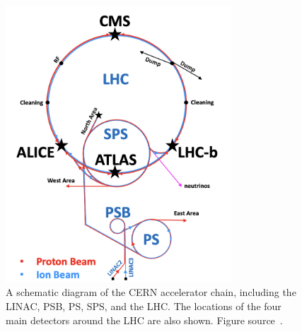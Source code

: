 \begin{figure}[t!]
\centering
\includegraphics[width=0.75\textwidth]{figures/acceleration_chain.png}
\caption[A diagram of the CERN accelerator chain]
{A schematic diagram of the CERN accelerator chain, including the LINAC, PSB, PS, SPS, and the LHC. The locations of the four main detectors around the LHC are also shown. Figure source~\cite{acceleration_complex}.}
\label{fig:acceleration_complex}
\end{figure}
